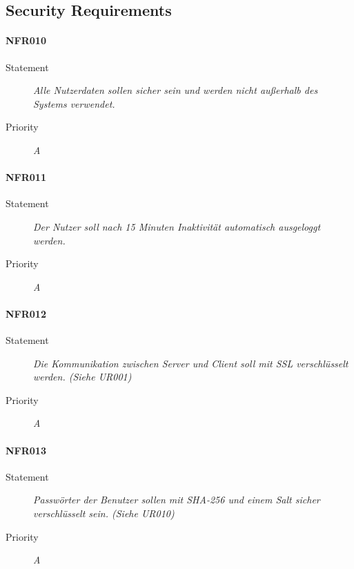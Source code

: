 \subsection{Security Requirements}
\paragraph{NFR010}
\begin{description}
\item [Statement] \textit{Alle Nutzerdaten sollen sicher sein und werden nicht außerhalb des Systems verwendet.}
\item [Priority] \textit{A}
\end{description}

\paragraph{NFR011}
\begin{description}
\item [Statement] \textit{Der Nutzer soll nach 15 Minuten Inaktivität automatisch ausgeloggt werden.}
\item [Priority] \textit{A}
\end{description}

\paragraph{NFR012}
\begin{description}
  \item [Statement] \textit{Die Kommunikation zwischen Server und Client soll mit \gls{SSL} verschlüsselt werden.
  (Siehe UR001)}
  \item [Priority] \textit{A}
\end{description}

\paragraph{NFR013}
\begin{description}
\item [Statement] \textit{Passwörter der Benutzer sollen mit \gls{SHA-256} und einem \gls{Salt} sicher verschlüsselt sein.
(Siehe UR010)}
  \item [Priority] \textit{A}
\end{description}
